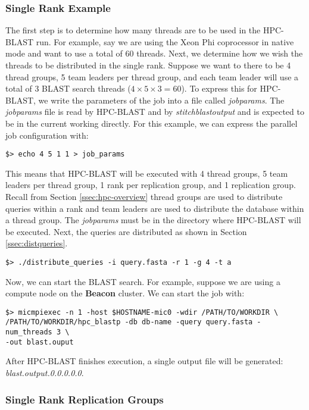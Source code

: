 \documentclass[10pt]{article}
\newcommand{\beac}{\textbf{Beacon }}
\begin{document}
\subsubsection{Single Rank Example} \label{sssec:hpcsingle}

The first step is to determine how many threads are to be used in the HPC-BLAST run.  For example, say we are using the Xeon Phi coprocessor in native mode and want to use a total of 60 threads.  Next, we determine how we wish the threads to be
distributed in the single rank.  Suppose we want to there to be 4 thread groups, 5 team leaders per thread group, and each team leader will use a total of 3 BLAST search threads (\(4 \times 5 \times 3 = 60\)).  To express this for HPC-BLAST, we write the
parameters of the job into a file called \emph{job\textunderscore params}.  The \emph{job\textunderscore params} file is read by HPC-BLAST and by \emph{stitch\textunderscore blast\textunderscore output} and is expected to be in the current working directly.
For this example, we can express the parallel job configuration with:
\begin{verbatim}
$> echo 4 5 1 1 > job_params
\end{verbatim}
\noindent This means that HPC-BLAST will be executed with 4 thread groups, 5 team leaders per thread group, 1 rank per replication group, and 1 replication group.  Recall from Section \ref{ssec:hpc-overview} thread groups are used to distribute queries within a rank and team leaders are used to
distribute the database within a thread group.  The \emph{job\textunderscore params} must be in the directory where HPC-BLAST will be executed.  Next, the queries are distributed as shown in Section \ref{ssec:distqueries}.
\begin{verbatim}
$> ./distribute_queries -i query.fasta -r 1 -g 4 -t a
\end{verbatim}
\noindent Now, we can start the BLAST search.  For example, suppose we are using a compute node on the \beac cluster.  We can start the job with:
\begin{verbatim}
$> micmpiexec -n 1 -host $HOSTNAME-mic0 -wdir /PATH/TO/WORKDIR \
/PATH/TO/WORKDIR/hpc_blastp -db db-name -query query.fasta -num_threads 3 \
-out blast.ouput
\end{verbatim}
\noindent After HPC-BLAST finishes execution, a single output file will be generated: \emph{blast.output.0.0.0.0.0}.

\subsubsection{Single Rank Replication Groups} \label{sssec:hpc1repg}
\end{document}
